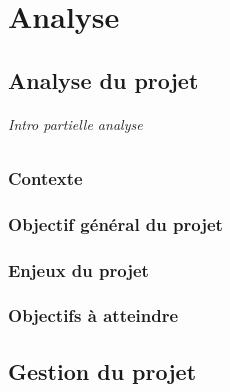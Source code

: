 \documentclass[
	headsepline=on,
	footsepline=on,
	twoside=off,
	abstract=on,
	DIV=10
]{scrreprt}
\begin{document}
				\paragraph{}
				\paragraph{}
				
			\subsection*{}
				\paragraph{}
				
				\paragraph{}
				
		
	\part{Analyse}
	\chapter{Analyse du projet}
		\paragraph{Intro partielle analyse}
		
		\section{Contexte}
		\section{Objectif général du projet}
		\section{Enjeux du projet}
		\section{Objectifs à atteindre}
	\chapter{Gestion du projet}
\end{document}
